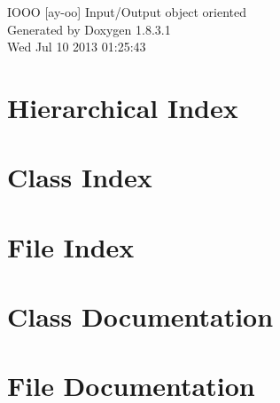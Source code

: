 \documentclass{book}
\begin{document}
\hypersetup{pageanchor=false,citecolor=blue}
\begin{titlepage}
\vspace*{7cm}
\begin{center}
{\Large I\-O\-O\-O \mbox{[}ay-\/oo\mbox{]} Input/\-Output object oriented }\\
\vspace*{1cm}
{\large Generated by Doxygen 1.8.3.1}\\
\vspace*{0.5cm}
{\small Wed Jul 10 2013 01:25:43}\\
\end{center}
\end{titlepage}
\clearemptydoublepage
{}
\tableofcontents
\clearemptydoublepage
{}
\hypersetup{pageanchor=true,citecolor=blue}
\chapter{Hierarchical Index}

\chapter{Class Index}

\chapter{File Index}

\chapter{Class Documentation}

















\chapter{File Documentation}




































\printindex
\end{document}
